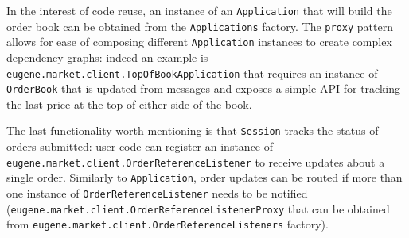 In the interest of code reuse, an instance of an \texttt{Application} that will build the order book can be obtained from the \texttt{Applications} factory. The \texttt{proxy} pattern allows for ease of composing different \texttt{Application} instances to create complex dependency graphs: indeed an example is \texttt{eugene.market.client.TopOfBookApplication} that requires an instance of \texttt{OrderBook} that is updated from messages and exposes a simple API for tracking the last price at the top of either side of the book.

The last functionality worth mentioning is that \texttt{Session} tracks the status of orders submitted: user code can register an instance of \\ \texttt{eugene.market.client.OrderReferenceListener} to receive updates about a single order. Similarly to \texttt{Application}, order updates can be routed if more than one instance of \texttt{OrderReferenceListener} needs to be notified \\ (\texttt{eugene.market.client.OrderReferenceListenerProxy} that can be obtained from \texttt{eugene.market.client.OrderReferenceListeners} factory).